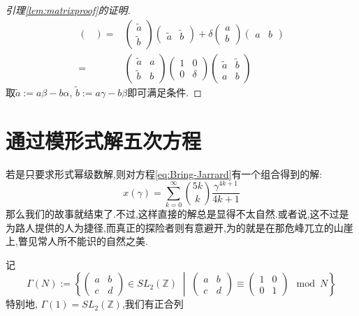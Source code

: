 \begin{enumerate}[Step 1.]
\begin{proof}[引理\ref{lem:matrixproof}的证明]
\begin{equation*}
\begin{aligned}
\begin{pmatrix}
		\end{pmatrix}=&
		\begin{pmatrix}
		\tilde{a} \\ \tilde{b}
		\end{pmatrix}
		\begin{pmatrix}
		\tilde{a} & \tilde{b}
		\end{pmatrix}
		+\delta
		\begin{pmatrix}
		a \\ b
		\end{pmatrix}
		\begin{pmatrix}
		a & b
		\end{pmatrix}\\
		=& 
		\begin{pmatrix}
		\tilde{a} & a \\ \tilde{b} & b
		\end{pmatrix}
		\begin{pmatrix}
		1 & 0 \\ 0 & \delta
		\end{pmatrix}
		\begin{pmatrix}
		\tilde{a} & \tilde{b} \\ a & b
		\end{pmatrix}
		\end{aligned}
		\end{equation*}
		取$\tilde{a}:=a\beta-b\alpha$, $\tilde{b}:=a\gamma-b\beta$即可满足条件.
	\end{proof}
\end{enumerate}


\section{通过模形式解五次方程}
若是只要求形式幂级数解,则对方程\eqref{eq:Bring-Jarrard}有一个组合得到的解:
$$x(\gamma) = \sum_{k=0}^{\infty} \binom{5k}{k} \frac{\gamma^{4k+1}}{4k+1}$$
那么我们的故事就结束了.不过,这样直接的解总是显得不太自然.或者说,这不过是为路人提供的人为捷径,而真正的探险者则有意避开,为的就是在那危峰兀立的山崖上,瞥见常人所不能识的自然之美.

记$$\Gamma(N):=\left\{ \begin{pmatrix}
a &b \\ c & d
\end{pmatrix} \in SL_2(\mathbb{Z}) \;\middle|\; \begin{pmatrix}
a &b \\ c & d
\end{pmatrix} \equiv \begin{pmatrix}
1 &0 \\ 0 & 1
\end{pmatrix} \mod N  \right\}$$
特别地, $\Gamma(1)=SL_2(\mathbb{Z})$,我们有正合列


